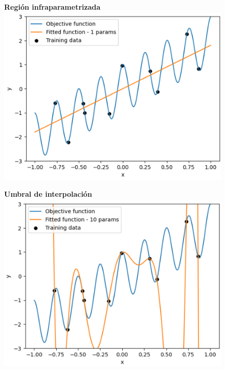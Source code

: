 \begin{figure}[h]
    \centering
    \begin{minipage}{0.32\textwidth}
        \centering
        \textbf{Región infraparametrizada} \\[0.5ex] 
        \includegraphics[width=\linewidth]{img/experiments/legendre1.1.png}
    \end{minipage}
    \begin{minipage}{0.32\textwidth}
        \centering
        \textbf{Umbral de interpolación} \\[0.5ex] 
        \includegraphics[width=\linewidth]{img/experiments/legendre1.2.png}
    \end{minipage}

\end{figure}
